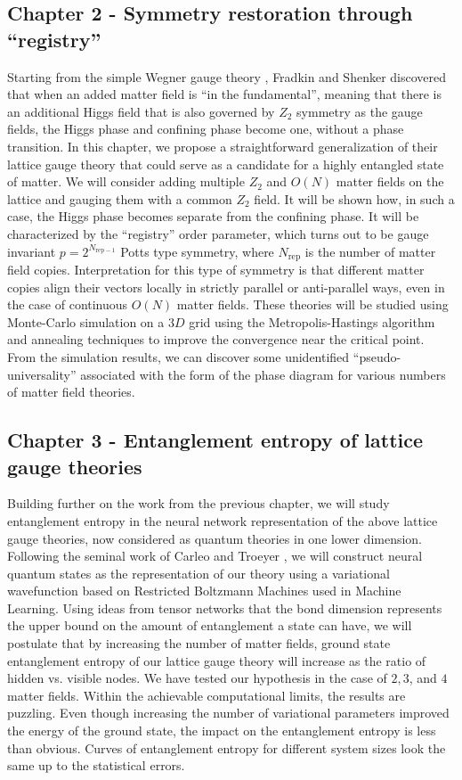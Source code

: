 \subsection{Chapter 2 - Symmetry restoration through ``registry''}
Starting from the simple Wegner gauge theory \cite{Wegner,Kogut}, Fradkin and Shenker \cite{Fradkinshenker} discovered that when an added matter field is ``in the fundamental'', meaning that there is an additional Higgs field that is also governed by $Z_2$ symmetry as the gauge fields, the Higgs phase and confining phase become one, without a phase transition. In this chapter, we propose a straightforward generalization of their lattice gauge theory that could serve as a candidate for a highly entangled state of matter. We will consider adding multiple $Z_2$ and $O(N)$ matter fields on the lattice and gauging them with a common $Z_2$ field. It will be shown how, in such a case, the Higgs phase becomes separate from the confining phase. It will be characterized by the ``registry'' order parameter, which turns out to be gauge invariant $p=2^{N_{\text{rep}-1}}$ Potts type symmetry, where $N_{\text{rep}}$ is the number of matter field copies. Interpretation for this type of symmetry is that different matter copies align their vectors locally in strictly parallel or anti-parallel ways, even in the case of continuous $O(N)$ matter fields. These theories will be studied using Monte-Carlo simulation on a $3D$ grid using the Metropolis-Hastings algorithm and annealing techniques to improve the convergence near the critical point. From the simulation results, we can discover some unidentified ``pseudo-universality'' associated with the form of the phase diagram for various numbers of matter field theories.

\subsection{Chapter 3 - Entanglement entropy of lattice gauge theories}
Building further on the work from the previous chapter, we will study entanglement entropy in the neural network representation of the above lattice gauge theories, now considered as quantum theories in one lower dimension. Following the seminal work of Carleo and Troeyer \cite{carleoTroyer}, we will construct neural quantum states as the representation of our theory using a variational wavefunction based on Restricted Boltzmann Machines used in Machine Learning. Using ideas from tensor networks that the bond dimension represents the upper bound on the amount of entanglement a state can have, we will postulate that by increasing the number of matter fields, ground state entanglement entropy of our lattice gauge theory will increase as the ratio of hidden vs. visible nodes. We have tested our hypothesis in the case of $2, 3$, and $4$ matter fields. Within the achievable computational limits, the results are puzzling. Even though increasing the number of variational parameters improved the energy of the ground state, the impact on the entanglement entropy is less than obvious. Curves of entanglement entropy for different system sizes look the same up to the statistical errors. 

